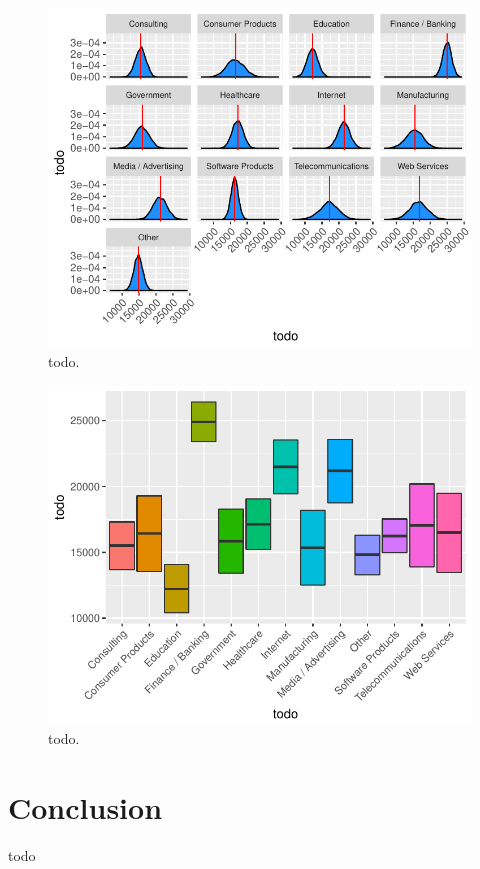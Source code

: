 \documentclass{article}
\begin{document}
\begin{figure}[H]
\centering
\includegraphics{report-044}
\caption{todo.}\label{fig_13}
\end{figure}


\begin{figure}[H]
\centering
\includegraphics{report-046}
\caption{todo.}\label{fig_14}
\end{figure}

\section{Conclusion}
todo
\end{document}
